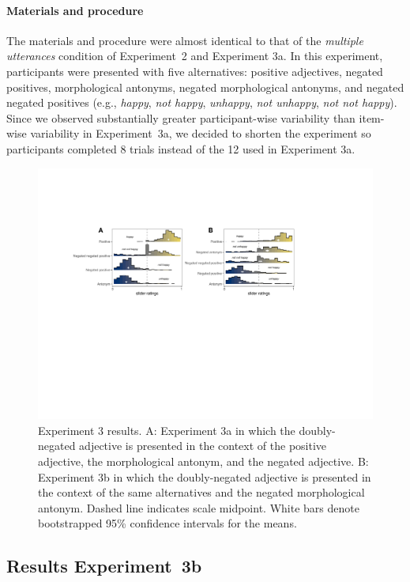 \documentclass[floatsintext,doc]{apa6}
\let\oldparagraph\paragraph
\renewcommand{\paragraph}[1]{\oldparagraph{#1}\mbox{}}
\begin{document}
\paragraph{Materials and procedure}\label{materials-3b}
The materials and procedure were almost identical to that of the \emph{multiple utterances} condition of Experiment~2 and Experiment 3a.
In this experiment, participants were presented with five  alternatives: positive adjectives, negated positives, morphological antonyms, negated morphological antonyms, and negated negated positives (e.g., \emph{happy}, \emph{not happy}, \emph{unhappy}, \emph{not unhappy}, \emph{not not happy}).
Since we observed substantially greater participant-wise variability than item-wise variability in Experiment~3a, we decided to shorten the experiment so participants completed 8 trials instead of the 12 used in Experiment 3a.

\begin{figure}[h]
\centering \includegraphics[width=\linewidth]{figs/expt3_directlabel_hist_ab} 
\caption{Experiment 3 results. A: Experiment 3a in which the doubly-negated adjective is presented in the context of the positive adjective, the morphological antonym, and the negated adjective. B: Experiment 3b in which the doubly-negated adjective is presented in the context of the same alternatives and the negated morphological antonym. Dashed line indicates scale midpoint. White bars denote bootstrapped 95\% confidence intervals for the means.}\label{fig:expt3-results}
\end{figure}


\subsection{Results Experiment~3b}
\end{document}
